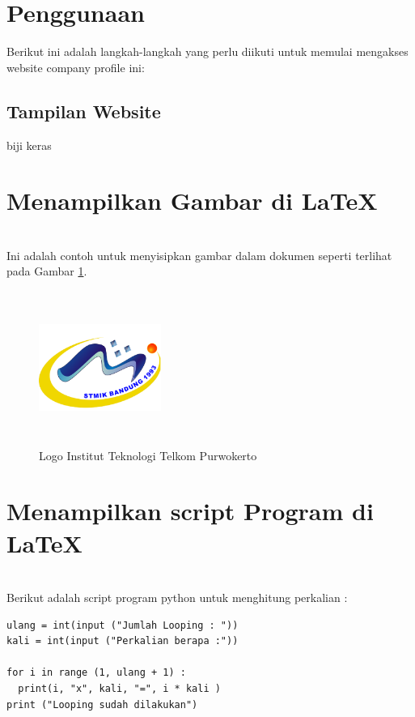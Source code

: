 \documentclass[a4paper,12 pt]{article}
\begin{document}
\section{Penggunaan}
Berikut ini adalah langkah-langkah yang perlu\linebreak 
diikuti untuk memulai mengakses website company profile ini:
\subsection{Tampilan Website}
biji keras
\section{Menampilkan Gambar di \LaTeX}
\blindtext\\
\linebreak
Ini adalah contoh untuk  menyisipkan gambar dalam dokumen seperti terlihat pada Gambar \ref{fig:logo}.
\begin{figure}[htp]
	\centering
	\includegraphics[width=4cm,height=5cm]{logo}
	\caption{Logo Institut Teknologi Telkom Purwokerto}
	\label{fig:logo}
\end{figure}

\section{Menampilkan script Program di \LaTeX}
\blindtext\\
\linebreak
Berikut adalah script program python untuk menghitung perkalian :

\begin{verbatim}
ulang = int(input ("Jumlah Looping : "))
kali = int(input ("Perkalian berapa :")) 

for i in range (1, ulang + 1) :
  print(i, "x", kali, "=", i * kali )
print ("Looping sudah dilakukan")
\end{verbatim}
\end{document}
